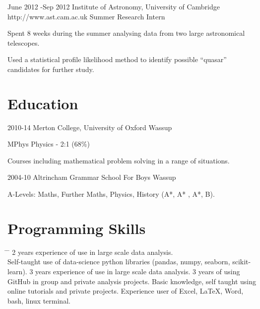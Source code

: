 \documentclass[10pt]{article} %
\begin{document}
\job
{June 2012 -}{Sep 2012}
{Institute of Astronomy, University of Cambridge}
{http://www.ast.cam.ac.uk}
{Summer Research Intern}
{\begin{itemize-noindent}
  \item{Spent 8 weeks during the summer analysing data from two large astronomical telescopes.}
  \item{Used a statistical profile likelihood method to identify possible ``quasar'' candidates for further study.}
 \end{itemize-noindent}}

\section{Education}
\edu
{2010-14}
{Merton College, University of Oxford}
{Wassup}
{
  \begin{itemize-noindent}
  \item{MPhys Physics - 2:1 (68\%)}
  \item{Courses including mathematical problem solving in a range of situations.}
  \end{itemize-noindent}
}

\edu
{2004-10}
{Altrincham Grammar School For Boys}
{Wassup}
{
  \begin{itemize-noindent}
  \item{A-Levels: Maths, Further Maths, Physics, History (A*, A* , A*, B).}
  \end{itemize-noindent}
}




\section{Programming Skills}
\begin{tabbing}
  \hspace{2mm} \= \hspace{18mm} \= \kill 
        {2 years experience of use in large scale data analysis.\\
                       \>\> Self-taught use of data-science python libraries (pandas, numpy, seaborn, scikit-learn).
  }
           {3 years experience of use in large scale data analysis.}
           {3 years of using GitHub in group and private analysis projects.}
           {Basic knowledge, self taught using online tutorials and private projects.}
         {Experience user of Excel, LaTeX, Word, bash, linux terminal.}
\end{tabbing}
\end{document}
